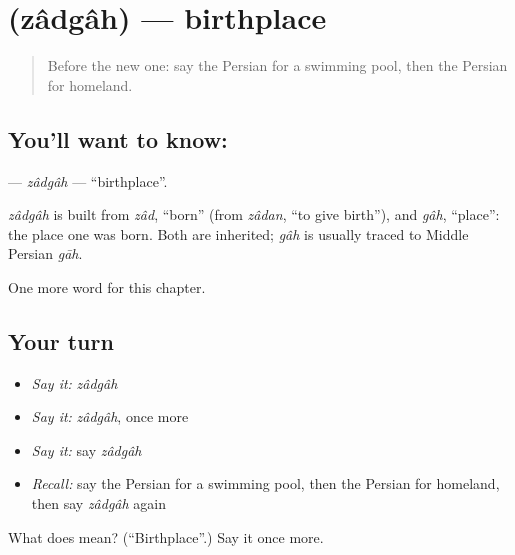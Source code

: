 \section[\texorpdfstring{\fa{زادگاه} (zâdgâh)}{زادگاه (zâdgâh)}]{ (zâdgâh) — birthplace}

\label{lesson:FA-C231-zadgah}



\begin{quote}
Before the new one: say the Persian for a swimming pool, then the Persian for homeland.
\end{quote}

\subsection*{You'll want to know: }
\textbf{} — \emph{zâdgâh} — \textquotedblleft{}birthplace\textquotedblright{}.

\begin{cousinweb}
\emph{zâdgâh} is built from \emph{zâd}, \textquotedblleft{}born\textquotedblright{} (from \emph{zâdan}, \textquotedblleft{}to give birth\textquotedblright{}), and \emph{gâh}, \textquotedblleft{}place\textquotedblright{}: the place one was born. Both are inherited; \emph{gâh} is usually traced to Middle Persian \emph{gāh}.
\end{cousinweb}

\begin{grammarlens}[title={What you've built}]
One more word for this chapter.
\end{grammarlens}

\subsection*{Your turn}
\begin{itemize}
\raggedright
  \item \emph{Say it:} \emph{zâdgâh}
  \item \emph{Say it:} \emph{zâdgâh}, once more
  \item \emph{Say it:} say \emph{zâdgâh}
  \item \emph{Recall:} say the Persian for a swimming pool, then the Persian for homeland, then say \emph{zâdgâh} again
\end{itemize}

\begin{tcolorbox}[breakable,colback=teal!4,colframe=teal!35!black,title={Before you move on}]
What does  mean? (\textquotedblleft{}Birthplace\textquotedblright{}.) Say it once more.
\end{tcolorbox}
